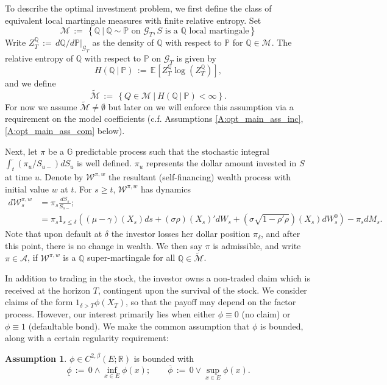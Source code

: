 \documentclass[11pt, letterpaper]{amsart}
\theoremstyle{definition}
\newtheorem{assumption}[theorem]{Assumption}
\theoremstyle{remark}
\numberwithin{equation}{section}
\newcommand{\reals}{\mathbb R}
\newcommand{\such}{\ | \ }
\newcommand{\We}{\mathcal{W}}
\newcommand{\prob}{\mathbb{P}}
\newcommand{\qprob}{\mathbb{Q}}
\newcommand{\esp}{\mathbb{E}}
\newcommand{\espalt}[2]{\esp^{#1}\bra{#2}}
\newcommand{\G}{\mathcal{G}}
\newcommand{\M}{\mathcal{M}}
\newcommand{\tM}{\widetilde{\mathcal{M}}}
\newcommand{\filtg}{\mathbb{G}}
\newcommand{\relent}[2]{H\left(#1\such #2\right)}
\newcommand{\dfn}{\, := \,}
\newcommand{\bra}[1]{\left[#1\right]}
\newcommand{\cbra}[1]{\left\{#1\right\}}
\newcommand{\ul}[1]{\underline{#1}}
\newcommand{\ol}[1]{\overline{#1}}
\begin{document}
To describe the optimal investment problem, we first define the class of equivalent local martingale measures with finite relative entropy.  Set
\begin{equation}\label{E:EQMM}
\M \dfn \cbra{\qprob\such \qprob\sim \prob \textrm{ on }\G_T, S \textrm{ is a } \qprob \textrm{ local martingale}}
\end{equation}
Write $Z^{\qprob}_T \dfn d\qprob/d\prob|_{\G_T}$ as the density of $\qprob$ with respect to $\prob$ for $\qprob\in\M$.  The relative entropy of $\qprob$ with respect to $\prob$ on $\G_T$ is given by
\begin{equation}\label{E:rel_ent}
\relent{\qprob}{\prob} \dfn \espalt{}{Z^{\qprob}_T \log\left(Z^{\qprob}_T\right)},
\end{equation}
and we define
\begin{equation}\label{E:M_rel_ent}
\tM \dfn \cbra{Q\in\M\such \relent{\qprob}{\prob} < \infty}.
\end{equation}
For now we assume $\tM\neq\emptyset$ but later on we will enforce this assumption via a requirement on the model coefficients (c.f. Assumptions \ref{A:opt_main_ass_inc}, \ref{A:opt_main_ass_com} below).


Next, let $\pi$ be a $\filtg$ predictable process such that the stochastic integral $\int_t^\cdot (\pi_u/S_{u-})dS_u$ is well defined. $\pi_u$ represents the dollar amount invested in $S$ at time $u$. Denote by $\We^{\pi,w}$ the resultant (self-financing) wealth process with initial value $w$ at $t$.  For $s\geq t$, $\We^{\pi,w}$ has dynamics
\begin{equation}\label{E:wealth_dynamics}
\begin{split}
d\We^{\pi,w}_s &= \pi_s \frac{dS_s}{S_{s-}};\\
&= \pi_s1_{s\leq \delta}\left(\left(\mu-\gamma\right)(X_s)ds + \left(\sigma\rho\right)(X_s)'dW_s + \left(\sigma\sqrt{1-\rho'\rho}\right)(X_s)dW^0_s\right) - \pi_s dM_s.
\end{split}
\end{equation}
Note that upon default at $\delta$ the investor losses her dollar position $\pi_{\delta}$, and after this point, there is no change in wealth.  We then say $\pi$ is admissible, and write $\pi\in\mathcal{A}$, if $\We^{\pi,w}$ is a $\qprob$ super-martingale for all $\qprob\in\tM$.

In addition to trading in the stock, the investor owns a non-traded claim which is received at the horizon $T$, contingent upon the survival of the stock.  We consider claims of the form $1_{\delta > T}\phi(X_T)$, so that the payoff may depend on the factor process. However, our interest primarily lies when either  $\phi\equiv 0$ (no claim) or $\phi\equiv 1$ (defaultable bond).  We make the common assumption that $\phi$ is bounded, along with a certain regularity requirement:
\begin{assumption}\label{A:phi}
$\phi\in C^{2,\beta}\left(E;\reals\right)$ is bounded with
\begin{equation}\label{E:phi_bounds}
\ul{\phi}\dfn 0 \wedge \inf_{x\in E}\phi(x);\qquad \ol{\phi}\dfn 0\vee \sup_{x\in E}\phi(x).
\end{equation}
\end{assumption}
\end{document}
